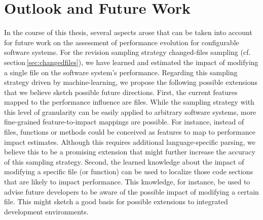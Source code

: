 \section{Outlook and Future Work}
In the course of this thesis, several aspects arose that can be taken into
account for future work on the assessment of performance evolution for
configurable software systems. For the revision sampling strategy changed-files
sampling (cf. section\,\ref{sec:changedfiles}), we have learned and estimated
the impact of modifying a single file on the software system’s performance. Regarding this
sampling strategy driven by machine-learning, we propose the following possible
extensions that we believe sketch possible future directions. First, the
current features mapped to the performance influence are files. While the
sampling strategy with this level of granularity can be easily applied to
arbitrary software systems, more fine-grained feature-to-impact mappings are
possible. For instance, instead of files, functions or methods could be
conceived as features to map to performance impact estimates. Although this
requires additional  language-specific parsing, we believe this to be a
promising extension that might further increase the accuracy of this sampling
strategy. Second, the learned knowledge about the impact of modifying a
specific file (or function) can be used to localize those code sections that
are likely to impact performance. This knowledge, for instance, be used to
advise future developers to be aware of the possible impact of modifying a
certain file. This might sketch a good basis for possible extensions to
integrated development environments.
